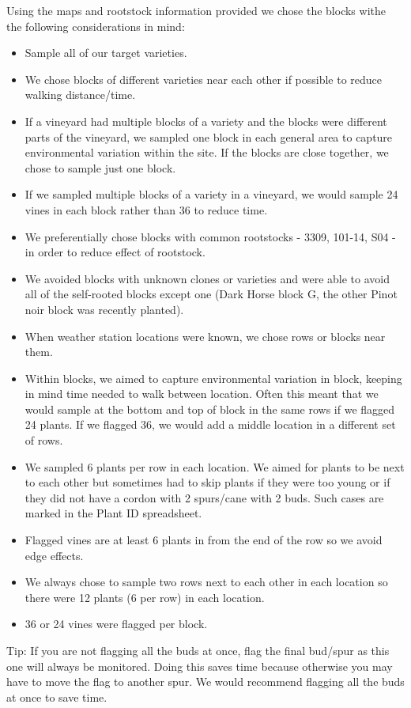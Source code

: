 \documentclass[11pt,letter]{article}
\newenvironment{smitemize}{
\begin{itemize}
  \setlength{\itemsep}{0pt}
  \setlength{\parskip}{0.8pt}
  \setlength{\parsep}{0pt}}
{\end{itemize}
}
\begin{document}
Using the maps and rootstock information provided we chose the blocks withe the following considerations in mind:
\begin{smitemize}
\item Sample all of our target varieties.
\item We chose blocks of different varieties near each other if possible to reduce walking distance/time. 
\item If a vineyard had multiple blocks of a variety and the blocks were different parts of the vineyard, we sampled one block in each general area to capture environmental variation within the site. If the blocks are close together, we chose to sample just one block.
\item If we sampled multiple blocks of a variety in a vineyard, we would sample 24 vines in each block rather than 36 to reduce time.
\item We preferentially chose blocks with common rootstocks - 3309, 101-14, S04 - in order to reduce effect of rootstock.
\item We avoided blocks with unknown clones or varieties and were able to avoid all of the self-rooted blocks except one (Dark Horse block G, the other Pinot noir block was recently planted).
\item When weather station locations were known, we chose rows or blocks near them.
\item Within blocks, we aimed to capture environmental variation in block, keeping in mind time needed to walk between location. Often this meant that we would sample at the bottom and top of block in the same rows if we flagged 24 plants. If we flagged 36, we would add a middle location in a different set of rows. 
\item We sampled 6 plants per row in each location. We aimed for plants to be next to each other but sometimes had to skip plants if they were too young or if they did not have a cordon with 2 spurs/cane with 2 buds. Such cases are marked in the Plant ID spreadsheet.
\item Flagged vines are at least 6 plants in from the end of the row so we avoid edge effects.
\item We always chose to sample two rows next to each other in each location so there were 12 plants (6 per row) in each location.
\item 36 or 24 vines were flagged per block.

\end{smitemize}

Tip: If you are not flagging all the buds at once, flag the final bud/spur as this one will always be monitored. Doing this saves time because otherwise you may have to move the flag to another spur. We would recommend flagging all the buds at once to save time.
\end{document}
